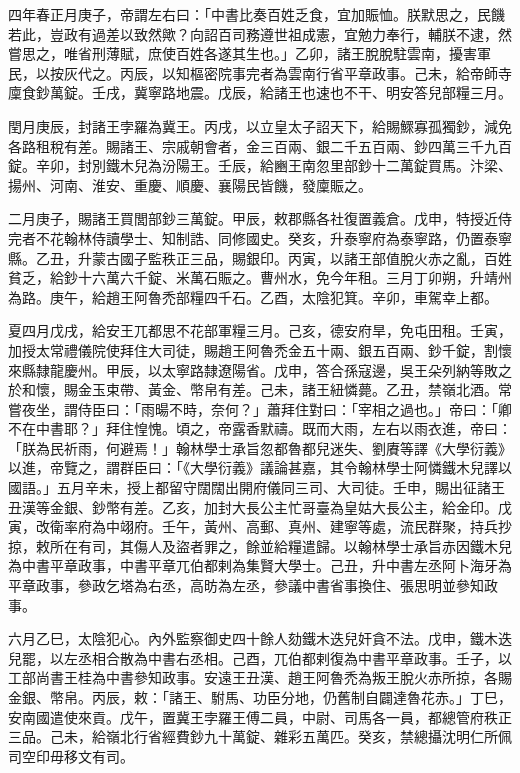 
\begin{pinyinscope}

 四年春正月庚子，帝謂左右曰：「中書比奏百姓乏食，宜加賑恤。朕默思之，民饑若此，豈政有過差以致然歟？向詔百司務遵世祖成憲，宜勉力奉行，輔朕不逮，然嘗思之，唯省刑薄賦，庶使百姓各遂其生也。」乙卯，諸王脫脫駐雲南，擾害軍民，以按灰代之。丙辰，以知樞密院事完者為雲南行省平章政事。己未，給帝師寺廩食鈔萬錠。壬戌，冀寧路地震。戊辰，給諸王也速也不干、明安答兒部糧三月。



 閏月庚辰，封諸王孛羅為冀王。丙戌，以立皇太子詔天下，給賜鰥寡孤獨鈔，減免各路租稅有差。賜諸王、宗戚朝會者，金三百兩、銀二千五百兩、鈔四萬三千九百錠。辛卯，封別鐵木兒為汾陽王。壬辰，給豳王南忽里部鈔十二萬錠買馬。汴梁、揚州、河南、淮安、重慶、順慶、襄陽民皆饑，發廩賑之。



 二月庚子，賜諸王買閭部鈔三萬錠。甲辰，敕郡縣各社復置義倉。戊申，特授近侍完者不花翰林侍讀學士、知制誥、同修國史。癸亥，升泰寧府為泰寧路，仍置泰寧縣。乙丑，升蒙古國子監秩正三品，賜銀印。丙寅，以諸王部值脫火赤之亂，百姓貧乏，給鈔十六萬六千錠、米萬石賑之。曹州水，免今年租。三月丁卯朔，升靖州為路。庚午，給趙王阿魯禿部糧四千石。乙酉，太陰犯箕。辛卯，車駕幸上都。



 夏四月戊戌，給安王兀都思不花部軍糧三月。己亥，德安府旱，免屯田租。壬寅，加授太常禮儀院使拜住大司徒，賜趙王阿魯禿金五十兩、銀五百兩、鈔千錠，割懷來縣隸龍慶州。甲辰，以太寧路隸遼陽省。戊申，答合孫寇邊，吳王朵列納等敗之於和懷，賜金玉束帶、黃金、幣帛有差。己未，諸王紐憐薨。乙丑，禁嶺北酒。常嘗夜坐，謂侍臣曰：「雨暘不時，奈何？」蕭拜住對曰：「宰相之過也。」帝曰：「卿不在中書耶？」拜住惶愧。頃之，帝露香默禱。既而大雨，左右以雨衣進，帝曰：「朕為民祈雨，何避焉！」翰林學士承旨忽都魯都兒迷失、劉賡等譯《大學衍義》以進，帝覽之，謂群臣曰：「《大學衍義》議論甚嘉，其令翰林學士阿憐鐵木兒譯以國語。」五月辛未，授上都留守闊闊出開府儀同三司、大司徒。壬申，賜出征諸王丑漢等金銀、鈔幣有差。乙亥，加封大長公主忙哥臺為皇姑大長公主，給金印。戊寅，改衛率府為中翊府。壬午，黃州、高郵、真州、建寧等處，流民群聚，持兵抄掠，敕所在有司，其傷人及盜者罪之，餘並給糧遣歸。以翰林學士承旨赤因鐵木兒為中書平章政事，中書平章兀伯都剌為集賢大學士。己丑，升中書左丞阿卜海牙為平章政事，參政乞塔為右丞，高昉為左丞，參議中書省事換住、張思明並參知政事。



 六月乙巳，太陰犯心。內外監察御史四十餘人劾鐵木迭兒奸貪不法。戊申，鐵木迭兒罷，以左丞相合散為中書右丞相。己酉，兀伯都剌復為中書平章政事。壬子，以工部尚書王桂為中書參知政事。安遠王丑漢、趙王阿魯禿為叛王脫火赤所掠，各賜金銀、幣帛。丙辰，敕：「諸王、駙馬、功臣分地，仍舊制自闢達魯花赤。」丁巳，安南國遣使來貢。戊午，置冀王孛羅王傅二員，中尉、司馬各一員，都總管府秩正三品。己未，給嶺北行省經費鈔九十萬錠、雜彩五萬匹。癸亥，禁總攝沈明仁所佩司空印毋移文有司。




\end{pinyinscope}

